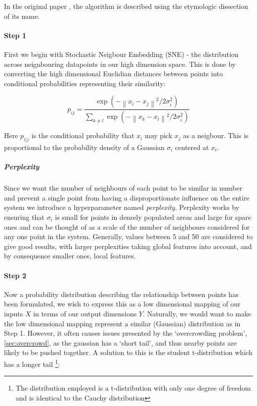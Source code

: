 In the original paper \citep{tsne}, the algorithm is described using the etymologic dissection of its name.

\paragraph{Step 1}
First we begin with Stochastic Neigbour Embedding (SNE) - the distribution across neignbouring datapoints in our high dimension space. This is done by converting the high dimensional Euclidian distances between points into conditional probabilities representing their similarity:

\begin{equation}
p_{ij} = \frac{\exp(-\left \| x_i - x_j \right \|^2 / 2\sigma_i^2)}{\sum_{k \neq l} \exp(- \left \| x_k - x_l \right \|^2 / 2\sigma_i^2)}
\end{equation}

Here $p_{i|j}$ is the conditional probability that $x_i$ may pick $x_j$ as a neigbour. This is proportional to the probability density of a Gaussian $\sigma_i$ centered at $x_i$.

\subparagraph{Perplexity}
Since we want the number of neighbours of each point to be similar in number and prevent a single point from having a disproportionate influence on the entire system we introduce a hyperparameter named \emph{perplexity}. Perplexity works by ensuring that $\sigma_i$ is small for points in densely populated areas and large for spare ones and can be thought of as a scale of the number of neighbours considered for any one point in the system. Generally, values between 5 and 50 are considered to give good results, with larger perplexities taking global features into account, and by consequence smaller ones, local features.

\paragraph{Step 2}
Now a probability distribution describing the relationship between points has been formulated, we wish to express this as a low dimensional mapping of our inputs $X$ in terms of our output dimensions $Y$. Naturally, we would want to make the low dimensional mapping represent a similar (Gaussian) distribution as in Step 1. However, it often causes issues presented by the `overcrowding problem', \autoref{sec:overcrowd}, as the gaussian has a `short tail', and thus nearby points are likely to be pushed together. A solution to this is the student t-distribution which has a longer tail \footnote{The distribution employed is a t-distribution with only one degree of freedom and is identical to the Cauchy distribution}:

